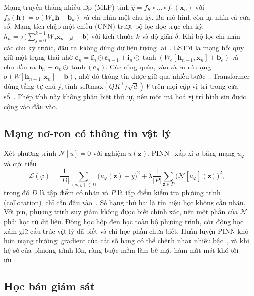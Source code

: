 Mạng truyền thẳng nhiều lớp (MLP) tính $\hat y = f_K \circ \dots \circ f_1(\mathbf{x}_n)$ với $f_k(\mathbf{h}) =
\sigma(W_k \mathbf{h} + \mathbf{b}_k)$ và chỉ nhìn một chu kỳ. Ba mô hình còn lại nhìn cả cửa sổ. Mạng tích chập một chiều
(CNN) trượt bộ lọc dọc trục chu kỳ, $h_n = \sigma\bigl(\sum_{j=0}^{k-1} W_j \mathbf{x}_{n - j\delta} + \mathbf{b}\bigr)$
với kích thước $k$ và độ giãn $\delta$. Khi bộ lọc chỉ nhìn các chu kỳ trước, đầu ra không dùng dữ liệu tương
lai~\cite{bai2018tcn}. LSTM là mạng hồi quy giữ một trạng thái nhớ $\mathbf{c}_n = \mathbf{f}_n \odot \mathbf{c}_{n-1} +
\mathbf{i}_n \odot \tanh(W_c[\mathbf{h}_{n-1}, \mathbf{x}_n] + \mathbf{b}_c)$ và cho đầu ra $\mathbf{h}_n = \mathbf{o}_n
\odot \tanh(\mathbf{c}_n)$. Các cổng quên, vào và ra có dạng $\sigma(W[\mathbf{h}_{n-1}, \mathbf{x}_n] + \mathbf{b})$,
nhờ đó thông tin được giữ qua nhiều bước~\cite{hochreiter1997}. Transformer dùng tầng tự chú ý, tính
$\mathrm{softmax}(QK^\top / \sqrt{d})\,V$ trên mọi cặp vị trí trong cửa sổ~\cite{vaswani2017}. Phép tính này không phân
biệt thứ tự, nên một mã hoá vị trí hình sin được cộng vào đầu vào.

\subsection{Mạng nơ-ron có thông tin vật lý}\label{sec:lt_pinn}

Xét phương trình $\mathcal{N}[u] = 0$ với nghiệm $u(\mathbf{z})$. PINN~\cite{raissi2019} xấp xỉ $u$ bằng mạng $u_\varphi$
và cực tiểu
\begin{equation}
\mathcal{L}(\varphi) = \frac{1}{|D|}\sum_{(\mathbf{z}, y) \in D}\big(u_\varphi(\mathbf{z}) - y\big)^2
 + \lambda \frac{1}{|P|}\sum_{\mathbf{z} \in P}\big(\mathcal{N}[u_\varphi](\mathbf{z})\big)^2,
\end{equation}
trong đó $D$ là tập điểm có nhãn và $P$ là tập điểm kiểm tra phương trình (collocation), chỉ cần đầu
vào~\cite{karniadakis2021}. Số hạng thứ hai là tín hiệu học không cần nhãn. Với pin, phương trình suy giảm không được biết
chính xác, nên một phần của $\mathcal{N}$ phải học từ dữ liệu. Động học hộp đen học toàn bộ phương trình, còn động học xám
giữ cấu trúc vật lý đã biết và chỉ học phần chưa biết. Huấn luyện PINN khó hơn mạng thường: gradient của các số hạng có
thể chênh nhau nhiều bậc~\cite{wang2021grad}, và khi hệ số của phương trình lớn, ràng buộc mềm làm bề mặt hàm mất mát khó
tối ưu~\cite{krishnapriyan2021}.

\subsection{Học bán giám sát}

